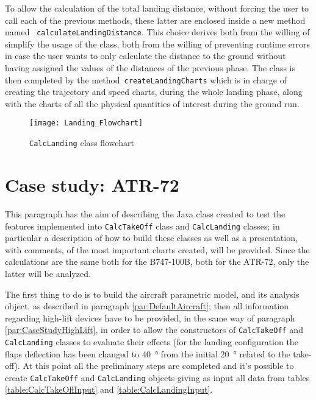 \bigskip
\noindent
To allow the calculation of the total landing distance, without forcing the user to call each of the previous methods, these latter are enclosed inside a new method named ~\lstinline[language=Java]!calculateLandingDistance!. This choice derives both from the willing of simplify the usage of the class, both from the willing of preventing runtime errors in case the user wants to only calculate the distance to the ground without having assigned the values of the distances of the previous phase. The class is then completed by the method~\lstinline[language=Java]!createLandingCharts! which is in charge of creating the trajectory and speed charts, during the whole landing phase, along with the charts of all the physical quantities of interest during the ground run.
%
\begin{figure}[H]
\centering
\texttt{[image: Landing\_Flowchart]}
\caption{\lstinline[language=Java]!CalcLanding! class flowchart}
\label{fig:CalcLandingFlowchart}
\end{figure}
%
\section{Case study: ATR-72}
This paragraph has the aim of describing the Java class created to test the features implemented into \lstinline[language=Java]!CalcTakeOff! class and \lstinline[language=Java]!CalcLanding! classes; in particular a description of how to build these classes as well as a presentation, with comments, of the most important charts created, will be provided. 
%
Since the calculations are the same both for the B747-100B, both for the ATR-72, only the latter will be analyzed. 

\bigskip
\noindent
The first thing to do is to build the aircraft parametric model, and its analysis object, as described in paragraph \ref{par:DefaultAircraft}; then all information regarding high-lift devices have to be provided, in the same way of paragraph \ref{par:CaseStudyHighLift}, in order to allow the constructors of \lstinline[language=Java]!CalcTakeOff! and \lstinline[language=Java]!CalcLanding! classes to evaluate their effects (for the landing configuration the flaps deflection has been changed to \SI{40}{\degree} from the initial \SI{20}{\degree} related to the take-off). 
%
At this point all the preliminary steps are completed and it's possible to create \lstinline[language=Java]!CalcTakeOff! and \lstinline[language=Java]!CalcLanding! objects giving as input all data from tables \ref{table:CalcTakeOffInput} and \ref{table:CalcLandingInput}.

